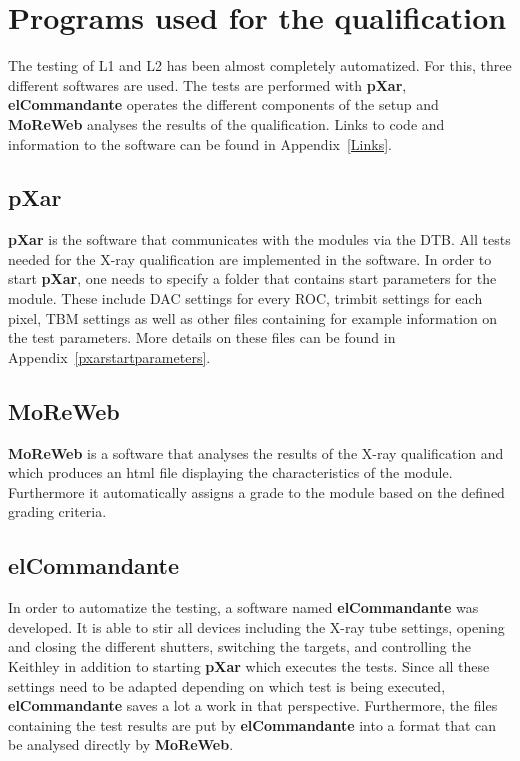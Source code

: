 \documentclass[a4paper,12pt,twoside]{article}
\begin{document}
\section{Programs used for the qualification}

The testing of L1 and L2 has been almost completely automatized. For this, three different softwares are used. The tests are performed with \textbf{pXar}, \textbf{elCommandante} operates the different components of the setup and \textbf{MoReWeb} analyses the results of the qualification. Links to code and information to the software can be found in Appendix~\ref{Links}.

\subsection{pXar}

\textbf{pXar} is the software that communicates with the modules via the DTB. All tests needed for the X-ray qualification are implemented in the software. In order to start \textbf{pXar}, one needs to specify a folder that contains start parameters for the module. These include DAC settings for every ROC, trimbit settings for each pixel, TBM settings as well as other files containing for example information on the test parameters. More details on these files can be found in Appendix~\ref{pxarstartparameters}.

\subsection{MoReWeb}

\textbf{MoReWeb} is a software that analyses the results of the X-ray qualification and which produces an html file displaying the characteristics of the module. Furthermore it automatically assigns a grade to the module based on the defined grading criteria. 


\subsection{elCommandante}

In order to automatize the testing, a software named \textbf{elCommandante} was developed. It is able to stir all devices including the X-ray tube settings, opening and closing the different shutters, switching the targets, and controlling the Keithley in addition to starting \textbf{pXar} which executes the tests. Since all these settings need to be adapted depending on which test is being executed, \textbf{elCommandante} saves a lot a work in that perspective. Furthermore, the files containing the test results are put by \textbf{elCommandante} into a format that can be analysed directly by \textbf{MoReWeb}. 
\end{document}
